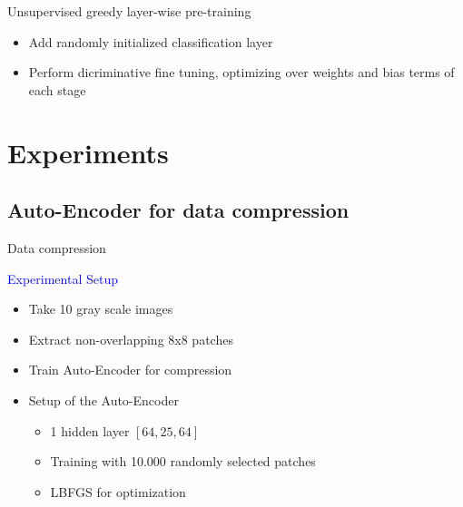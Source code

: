 			
	\begin{frame}[t]{Unsupervised greedy layer-wise pre-training}
		\begin{itemize}
				\item Add randomly initialized classification layer
				\item Perform dicriminative fine tuning, optimizing over weights and bias 
					terms of each stage
		\end{itemize}
		\begin{figure}
			\end{figure}
				
	\end{frame}

\section{Experiments}
	\subsection{Auto-Encoder for data compression}
	
	\begin{frame}[t]{Data compression}
	
	\begin{minipage}[t]{0.48\linewidth}
	\textcolor{blue}{\Large Experimental Setup}	
	\begin{itemize}
			\item Take 10 gray scale images
			\item Extract non-overlapping 8x8 patches
			\item Train Auto-Encoder for compression		
			\item Setup of the Auto-Encoder			
				\begin{itemize}
					\item 1 hidden layer $[64, 25, 64]$
					\item Training with 10.000 randomly selected patches
					\item LBFGS for optimization
					\end{itemize}
		\end{itemize}
	\end{minipage}\hfill
	\begin{minipage}[t]{0.48\linewidth}
		\begin{figure}
		\end{figure}
	\end{minipage}
	
	\end{frame}
	
